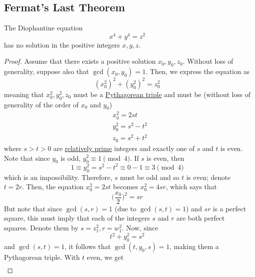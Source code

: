 \documentclass{article}
\newcounter{theorem}[section]
\begin{document}
\subsection{Fermat's Last Theorem}
\begin{theorem}[No Positive Solutions to $x^4 + y^4 = z^2$]
  \label{thm:no-positive-solutions-to-x4y4z2}
The Diophantine equation 
\begin{equation}
  x^4 + y^4 = z^2
\end{equation}
has no solution in the positive integers $x, y, z$. 
\end{theorem}
\begin{proof}
Assume that there exists a positive solution $x_0, y_0, z_0$. Without loss of generality, suppose also that $\gcd(x_0, y_0) = 1$. Then, we express the equation as
\begin{equation}
  (x_0^2)^2 +(y_0^2)^2 = z_0^2
\end{equation}
meaning that $x_0^2, y_0^2, z_0$ must be a \hyperref[def:pythagorean-triple]{Pythagorean triple} and must be (without loss of generality of the order of $x_0$ and $y_0$)
\begin{align*}
    & x_0^2 = 2st \\
    & y_0^2 = s^2 - t^2 \\
    & z_0 = s^2 + t^2
\end{align*}
where $s > t > 0$ are \hyperref[def:relatively-prime]{relatively prime} integers and exactly one of $s$ and $t$ is even. Note that since $y_0$ is odd, $y_0^2 \equiv 1 \pmod{4}$. If $s$ is even, then 
\begin{equation}
  1 \equiv y_0^2 = s^2 - t^2 \equiv 0 - 1 \equiv 3 \pmod{4}
\end{equation}
which is an impossibility. Therefore, $s$ must be odd and so $t$ is even; denote $t = 2r$. Then, the equation $x_0^2 = 2st$ becomes $x_0^2 = 4sr$, which says that
\begin{equation}
  \bigg(\frac{x_0}{2} \bigg)^2 = sr
\end{equation}
But note that since $\gcd(s, r) = 1$ (due to $\gcd(s, t) = 1$) and $sr$ is a perfect square, this must imply that each of the integers $s$ and $r$ are both perfect squares. Denote them by $s = z_1^2, r = w_1^2$. Now, since 
\begin{equation}
  t^2 + y_0^2 = s^2
\end{equation}
and $\gcd(s, t) = 1$, it follows that $\gcd(t, y_0, s) = 1$, making them a Pythagorean triple. With $t$ even, we get
\begin{align*}

\end{align*}
\end{proof}
\end{document}
